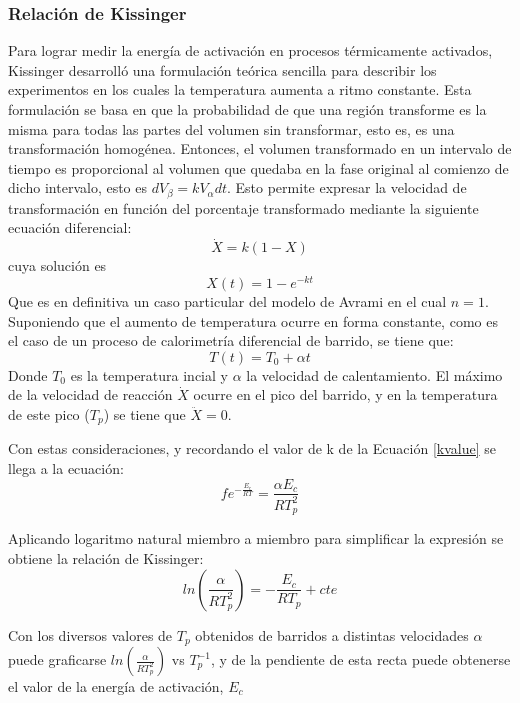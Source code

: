 \documentclass{article}
\theoremstyle{definition}
\theoremstyle{remark}
\begin{document}
\subsubsection{Relación de Kissinger}
Para lograr medir la energía de activación en procesos térmicamente activados, Kissinger desarrolló una formulación teórica sencilla para describir los experimentos en los cuales la temperatura aumenta a ritmo constante. Esta formulación se basa en que la probabilidad de que una región transforme es la misma para todas las partes del volumen sin transformar, esto es, es una transformación homogénea. Entonces, el volumen transformado en un intervalo de tiempo es proporcional al volumen que quedaba en la fase original al comienzo de dicho intervalo, esto es $dV_\beta = k V_\alpha dt$. Esto permite expresar la velocidad de transformación en función del porcentaje transformado mediante la siguiente ecuación diferencial:
\begin{equation}
	\dot{X} = k(1-X)
\end{equation}
cuya solución es
\begin{equation}
	X(t) = 1 - e^{-kt}
\end{equation}
Que es en definitiva un caso particular del modelo de Avrami en el cual $n=1$.
Suponiendo que el aumento de temperatura ocurre en forma constante, como es el caso de un proceso de calorimetría diferencial de barrido, se tiene que:
\begin{equation}
	T(t) = T_0+\alpha t
\end{equation}
Donde $T_0$ es la temperatura incial y $\alpha$ la velocidad de calentamiento. El máximo de la velocidad de reacción $\dot{X}$ ocurre en el pico del barrido, y en la temperatura de este pico ($T_p$) se tiene que $\ddot{X} = 0$.

Con estas consideraciones, y recordando el valor de k de la Ecuación \ref{kvalue} se llega a la ecuación:
\begin{equation}
	fe^{-\frac{E_c}{RT}} = \frac{\alpha E_c}{R T_p^2}
\end{equation}

Aplicando logaritmo natural miembro a miembro para simplificar la expresión se obtiene la relación de Kissinger:
\begin{equation}
	ln(\frac{\alpha}{R T_p^2}) = -\frac{E_c}{RT_p} + cte
\end{equation}

Con los diversos valores de $T_p$ obtenidos de barridos a distintas velocidades $\alpha$ puede graficarse $ln(\frac{\alpha}{R T_p^2})$ vs $T_p^{-1}$, y de la pendiente de esta recta puede obtenerse el valor de la energía de activación, $E_c$
\end{document}
